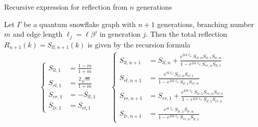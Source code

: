 \documentclass{beamer}
\newcommand{\abs}[1]{\left\lvert#1\right\rvert}
\begin{document}
  \begin{frame}{Recursive expression for reflection from $n$ generations}
    \begin{theorem}
      Let $\Gamma$ be a quantum snowflake graph with $n+1$ generations, branching number $m$ and edge length $\ell_j = \ell\beta^j$ in generation $j$. Then the total reflection $R_{n+1}(k) = S_{ll,n+1}(k)$ is given by the recursion formula
      \begin{align*}
        \left\lbrace\!
        \begin{aligned}
          S_{ll,1} &= \frac{1-m}{1+m} \\
          S_{rl,1} &= \frac{2\sqrt{m}}{1+m} \\
          S_{rr,1} &= -S_{ll,1} \\
          S_{lr,1} &= S_{rl,1}
        \end{aligned}\right.
        &&
        \left\lbrace\!
        \begin{aligned}
          S_{ll,n+1} &= S_{ll,n} + \frac{e^{2ik\ell_n} S_{rl,n} S_{ll,1} S_{lr,n}}{1 - e^{2ik\ell_n} S_{rr,n} S_{ll,1}} \\
          S_{rl,n+1} &= \frac{e^{ik\ell_n} S_{rl,n} S_{rl,1}}{1 - e^{2ik\ell_n} S_{ll,1} S_{rr,n}} \\
          S_{rr,n+1} &= S_{rr,1} + \frac{e^{2ik\ell_n} S_{lr,1} S_{rr,n} S_{rl,1}}{1 - e^{2ik\ell_n} S_{ll,1} S_{rr,n}} \\
          S_{lr,n+1} &= \frac{e^{ik\ell_n} S_{lr,1}S_{lr,n}}{1 - e^{2ik\ell_n} S_{rr,n} S_{ll,1}}
        \end{aligned}\right.
      \end{align*}
    \end{theorem}
  \end{frame}

\end{document}
